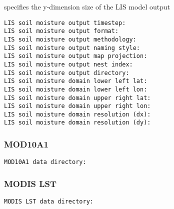  specifies the y-dimension size of the LIS model output
 

 \begin{Verbatim}[frame=single]
LIS soil moisture output timestep:
LIS soil moisture output format:
LIS soil moisture output methodology:
LIS soil moisture output naming style:
LIS soil moisture output map projection:
LIS soil moisture output nest index:
LIS soil moisture output directory:
LIS soil moisture domain lower left lat:
LIS soil moisture domain lower left lon:
LIS soil moisture domain upper right lat:
LIS soil moisture domain upper right lon:
LIS soil moisture domain resolution (dx):
LIS soil moisture domain resolution (dy):
 \end{Verbatim}

 
 \subsubsection{MOD10A1} 

  

 

 \begin{Verbatim}[frame=single]
MOD10A1 data directory:
 \end{Verbatim}

 
 \subsubsection{MODIS LST} 

  

 

 \begin{Verbatim}[frame=single]
MODIS LST data directory:
 \end{Verbatim}


